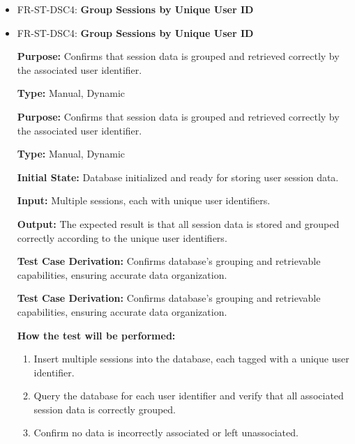 \documentclass[12pt, titlepage]{article}
\begin{document}
\begin{itemize}
  \item FR-ST-DSC4: \textbf{Group Sessions by Unique User ID}
  \item FR-ST-DSC4: \textbf{Group Sessions by Unique User ID}
  \begin{mdframed}[linewidth=0.5mm]
      \textbf{Purpose:} Confirms that session data is grouped and retrieved correctly by the associated user identifier. \par
      \textbf{Type:} Manual, Dynamic \par
      \textbf{Purpose:} Confirms that session data is grouped and retrieved correctly by the associated user identifier. \par
      \textbf{Type:} Manual, Dynamic \par
      \textbf{Initial State:} Database initialized and ready for storing user session data. \par
      \textbf{Input:} Multiple sessions, each with unique user identifiers. \par
      \textbf{Output:} The expected result is that all session data is stored and grouped correctly according to the unique user identifiers. \par
      \textbf{Test Case Derivation:} Confirms database's grouping and retrievable capabilities, ensuring accurate data organization.\par
      \textbf{Test Case Derivation:} Confirms database's grouping and retrievable capabilities, ensuring accurate data organization.\par
      \textbf{How the test will be performed:}
      \begin{enumerate}[noitemsep]
        \item Insert multiple sessions into the database, each tagged with a unique user identifier.
        \item Query the database for each user identifier and verify that all associated session data is correctly grouped.
        \item Confirm no data is incorrectly associated or left unassociated.
      \end{enumerate}
  \end{mdframed}


\end{itemize}
\end{document}
